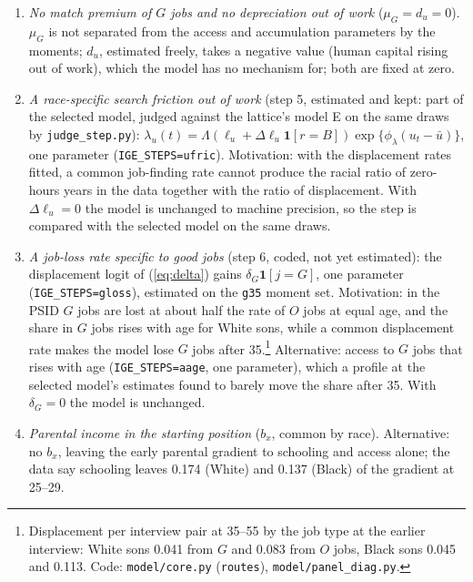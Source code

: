 \documentclass[11pt]{article}
\newcommand{\code}[1]{\texttt{#1}}
\newcommand{\1}{\mathbf{1}}
\begin{document}
\begin{enumerate}[label=D\arabic*.]
  schooling only, which leaves the race-neutral learning-ability channel \citep{huggett2011sources} untested next to the
  job side.
  \item\label{dec:fixed} \textit{No match premium of $G$ jobs and no depreciation out of work} ($\mu_G = d_u = 0$).
  $\mu_G$ is not separated from the access and accumulation parameters by the moments; $d_u$, estimated freely, takes a
  negative value (human capital rising out of work), which the model has no mechanism for; both are fixed at zero.
  \item\label{dec:ufric} \textit{A race-specific search friction out of work} (step 5, estimated and kept: part of the
  selected model, judged against the lattice's model E on the same draws by \code{judge\_step.py}):
  $\lambda_u(t) = \Lambda(\ell_u + \Delta\ell_u \1[r = B])\exp\{\phi_\lambda(u_t - \bar u)\}$, one parameter
  (\code{IGE\_STEPS=ufric}). Motivation: with the displacement rates fitted, a common job-finding rate cannot produce
  the racial ratio of zero-hours years in the data together with the ratio of displacement. With $\Delta\ell_u = 0$ the
  model is unchanged to machine precision, so the step is compared with the selected model on the same draws.
  \item\label{dec:gloss} \textit{A job-loss rate specific to good jobs} (step 6, coded, not yet estimated): the
  displacement logit of (\ref{eq:delta}) gains $\delta_G \1[j = G]$, one parameter (\code{IGE\_STEPS=gloss}), estimated
  on the \code{g35} moment set. Motivation: in the PSID $G$ jobs are lost at about half the rate of $O$ jobs at equal
  age, and the share in $G$ jobs rises with age for White sons, while a common displacement rate makes the model lose
  $G$ jobs after 35.\footnote{Displacement per interview pair at 35--55 by the job type at the earlier interview: White
  sons 0.041 from $G$ and 0.083 from $O$ jobs, Black sons 0.045 and 0.113. Code: \code{model/core.py}
  (\code{routes}), \code{model/panel\_diag.py}.} Alternative: access to $G$ jobs that rises with age
  (\code{IGE\_STEPS=aage}, one parameter), which a profile at the selected model's estimates found to barely move the
  share after 35. With $\delta_G = 0$ the model is unchanged.
  \item \textit{Parental income in the starting position} ($b_x$, common by race). Alternative: no $b_x$, leaving the
  early parental gradient to schooling and access alone; the data say schooling leaves 0.174 (White) and 0.137 (Black)
  of the gradient at 25--29.
\end{enumerate}



\end{document}
